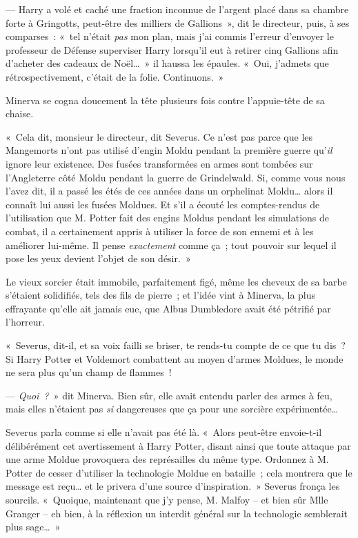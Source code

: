--- Harry a volé et caché une fraction inconnue de l'argent placé dans sa chambre forte à Gringotts, peut-être des milliers de Gallions~», dit le directeur, puis, à ses comparses~: «~tel n'était \emph{pas} mon plan, mais j'ai commis l'erreur d'envoyer le professeur de Défense superviser Harry lorsqu'il eut à retirer cinq Gallions afin d'acheter des cadeaux de Noël…~» il haussa les épaules. «~Oui, j'admets que rétrospectivement, c'était de la folie. Continuons.~»

Minerva se cogna doucement la tête plusieurs fois contre l'appuie-tête de sa chaise.

«~Cela dit, monsieur le directeur, dit Severus. Ce n'est pas parce que les Mangemorts n'ont pas utilisé d'engin Moldu pendant la première guerre qu'\emph{il} ignore leur existence. Des fusées transformées en armes sont tombées sur l'Angleterre côté Moldu pendant la guerre de Grindelwald. Si, comme vous nous l'avez dit, il a passé les étés de ces années dans un orphelinat Moldu… alors il connaît lui aussi les fusées Moldues. Et s'il a écouté les comptes-rendus de l'utilisation que M. Potter fait des engins Moldus pendant les simulations de combat, il a certainement appris à utiliser la force de son ennemi et à les améliorer lui-même. Il pense \emph{exactement} comme ça~; tout pouvoir sur lequel il pose les yeux devient l'objet de son désir.~»

Le vieux sorcier était immobile, parfaitement figé, même les cheveux de sa barbe s'étaient solidifiés, tels des fils de pierre~; et l'idée vint à Minerva, la plus effrayante qu'elle ait jamais eue, que Albus Dumbledore avait été pétrifié par l'horreur.

«~Severus, dit-il, et sa voix failli se briser, te rends-tu compte de ce que tu dis~? Si Harry Potter et Voldemort combattent au moyen d'armes Moldues, le monde ne sera plus qu'un champ de flammes~!

--- \emph{Quoi~?}~» dit Minerva. Bien sûr, elle avait entendu parler des armes à feu, mais elles n'étaient pas \emph{si} dangereuses que ça pour une sorcière expérimentée…

Severus parla comme si elle n'avait pas été là. «~Alors peut-être envoie-t-il délibérément cet avertissement à Harry Potter, disant ainsi que toute attaque par une arme Moldue provoquera des représailles du même type. Ordonnez à M. Potter de cesser d'utiliser la technologie Moldue en bataille~; cela montrera que le message est reçu… et le privera d'une source d'inspiration.~» Severus fronça les sourcils. «~Quoique, maintenant que j'y pense, M. Malfoy -- et bien sûr Mlle Granger -- eh bien, à la réflexion un interdit général sur la technologie semblerait plus sage…~»

